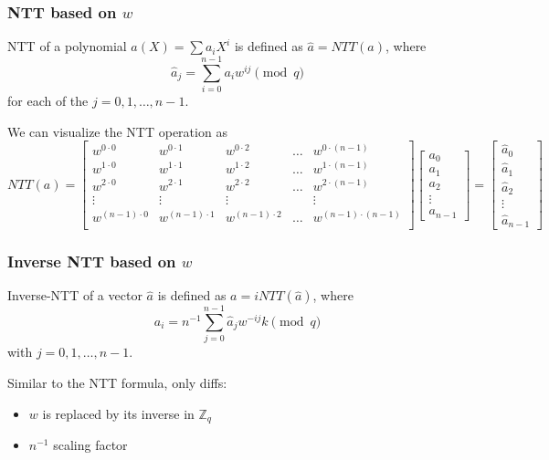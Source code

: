 \documentclass{article}
\newcommand{\Zq}{\mathbb{Z}_q}
\begin{document}
\subsubsection{NTT based on \texorpdfstring{$w$}{w}}
NTT of a polynomial $a(X) = \sum a_i X^i$ is defined as $\hat{a} = NTT(a)$,
where
$$\hat{a}_j = \sum_{i=0}^{n-1} a_i w^{ij} \pmod q$$
for each of the $j=0,1,\ldots, n-1$.

We can visualize the NTT operation as
$$
NTT(a) =
\begin{bmatrix}
w^{0 \cdot 0} & w^{0 \cdot 1} & w^{0 \cdot 2} & \ldots & w^{0 \cdot (n-1)} \\
w^{1 \cdot 0} & w^{1 \cdot 1} & w^{1 \cdot 2} & \ldots & w^{1 \cdot (n-1)} \\
w^{2 \cdot 0} & w^{2 \cdot 1} & w^{2 \cdot 2} & \ldots & w^{2 \cdot (n-1)} \\
\vdots & \vdots & \vdots & & \vdots\\
w^{(n-1) \cdot 0} & w^{(n-1) \cdot 1} & w^{(n-1) \cdot 2} & \ldots & w^{(n-1) \cdot (n-1)} \\
\end{bmatrix}
\begin{bmatrix}
a_0 \\ a_1 \\ a_2 \\ \vdots \\ a_{n-1}
\end{bmatrix}
=
\begin{bmatrix}
\hat{a}_0 \\ \hat{a}_1 \\ \hat{a}_2 \\ \vdots \\ \hat{a}_{n-1}
\end{bmatrix}
$$

\subsubsection{Inverse NTT based on \texorpdfstring{$w$}{w}}
Inverse-NTT of a vector $\hat{a}$ is defined as $a = iNTT(\hat{a})$, where
$$a_i = n^{-1} \sum_{j=0}^{n-1} \hat{a}_j w^{-ij}k \pmod q$$
with $j=0,1,\ldots,n-1$.

Similar to the NTT formula, only diffs:
\begin{itemize}
    \item $w$ is replaced by its inverse in $\Zq$
    \item $n^{-1}$ scaling factor
\end{itemize}
\end{document}
